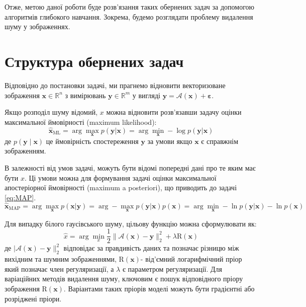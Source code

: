 \documentclass[14pt,a4paper]{extarticle}
\newcounter{e}
\numberwithin{equation}{section}
\numberwithin{figure}{section}
\begin{document}
	Отже, метою даної роботи буде розв'язання таких обернених задач за допомогою алгоритмів глибокого навчання. Зокрема, будемо розглядати проблему видалення шуму у зображеннях.

	\newpage
	\thispagestyle{empty}
	\section{Структура обернених задач}

	Відповідно до постановки задачі, ми прагнемо відновити векторизоване зображення $\boldsymbol{x} \in \mathbb{R}^{n}$ з вимірювань $\boldsymbol{y} \in \mathbb{R}^{m}$ у вигляді $\boldsymbol{y}=\mathcal{A}\left(\boldsymbol{x}\right)+\boldsymbol{\varepsilon}$.

	Якщо розподіл шуму відомий, $x$ можна відновити розв'язавши задачу оцінки максимальної ймовірності (maximum likelihood):
	\begin{equation}
		\hat{\boldsymbol{x}}_{\mathrm{ML}}
		= \arg \max_{\boldsymbol{x}} {p (\boldsymbol{y} | \boldsymbol{x})}
		= \arg \min_{\boldsymbol{x}} -\log p(\boldsymbol{y} | \boldsymbol{x})
	\end{equation}
	де $p(\boldsymbol{y} \mid \boldsymbol{x})$ це ймовірність спостереження $\boldsymbol{y}$ за умови якщо $\boldsymbol{x}$ є справжнім зображенням.
	
	В залежності від умов задачі, можуть бути відомі попередні дані про те яким має бути $x$. Ці умови можна для формування  задачі оцінки максимальної апостеріорної ймовірності (maximum a posteriori), що приводить до задачі \ref{eq:MAP}.
	\begin{equation}
		\label{eq:MAP-problem}
		\hat{\boldsymbol{x}}_{\mathrm{MAP}}
		=
		\arg \max_{\boldsymbol{x}} p(\boldsymbol{x} | \boldsymbol{y}) 
		=
		\arg -\max_{\boldsymbol{x}} { p(\boldsymbol{y} | \boldsymbol{x})} p(\boldsymbol{x})
		=
		\arg \min_{\boldsymbol{x}} -\ln p(\boldsymbol{y} | \boldsymbol{x})-\ln p(\boldsymbol{x})
	\end{equation}
	
	Для випадку білого гаусівського шуму, цільову функцію можна сформулювати як:
	\begin{equation}
		\label{eq:MAP-avgn}
		\hat{x}=\arg \min_{x} 	\frac{1}{2}\|\mathcal{A}(\boldsymbol{x})-\boldsymbol{y}\|_{2}^{2}+\lambda \mathrm{R}(\boldsymbol{x})
	\end{equation}
	де  $|\mathcal{A}(\boldsymbol{x})-\boldsymbol{y}\|_{2}^{2}$ відповідає за правдивість даних та позначає різницю між вихідним та шумним зображеннями, $\mathrm{R}(\boldsymbol{x})$- від'ємний логарифмічний пріор який позначає член регуляризації, а $\lambda$ є параметром регуляризації. Для варіаційних методів видалення шуму, ключовим є пошук відповідного пріору зображення $\mathrm{R}(\boldsymbol{x})$. Варіантами таких пріорів моделі можуть бути градієнтні або розріджені пріори.
\end{document}
